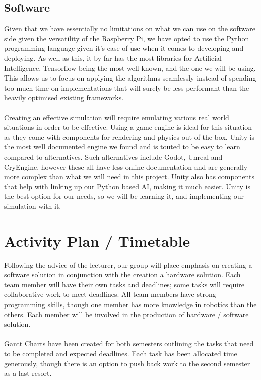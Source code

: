 \documentclass[8pt]{article}
\begin{document}
\subsection{Software}
Given that we have essentially no limitations on what we can use on the software side given the versatility of the Raspberry Pi, we have opted to use the Python programming language given it’s ease of use when it comes to developing and deploying. As well as this, it by far has the most libraries for Artificial Intelligence, Tensorflow being the most well known, and the one we will be using. This allows us to focus on applying the algorithms seamlessly instead of spending too much time on implementations that will surely be less performant than the heavily optimised existing frameworks.
\\\\
Creating an effective simulation will require emulating various real world situations in order to be effective. Using a game engine is ideal for this situation as they come with components for rendering and physics out of the box. Unity is the most well documented engine we found and is touted to be easy to learn compared to alternatives. Such alternatives include Godot, Unreal and CryEngine, however these all have less online documentation and are generally more complex than what we will need in this project. Unity also has components that help with linking up our Python based AI, making it much easier. Unity is the best option for our needs, so we will be learning it, and implementing our simulation with it.

\section{Activity Plan / Timetable}
Following the advice of the lecturer, our group will place emphasis on creating a software solution in conjunction with the creation a hardware solution. Each team member will have their own tasks and deadlines; some tasks will require collaborative work to meet deadlines. All team members have strong programming skills, though one member has more knowledge in robotics than the others. Each member will be involved in the production of hardware / software solution.
\\\\
Gantt Charts have been created for both semesters outlining the tasks that need to be completed and expected deadlines. Each task has been allocated time generously, though there is an option to push back work to the second semester as a last resort.
\end{document}
